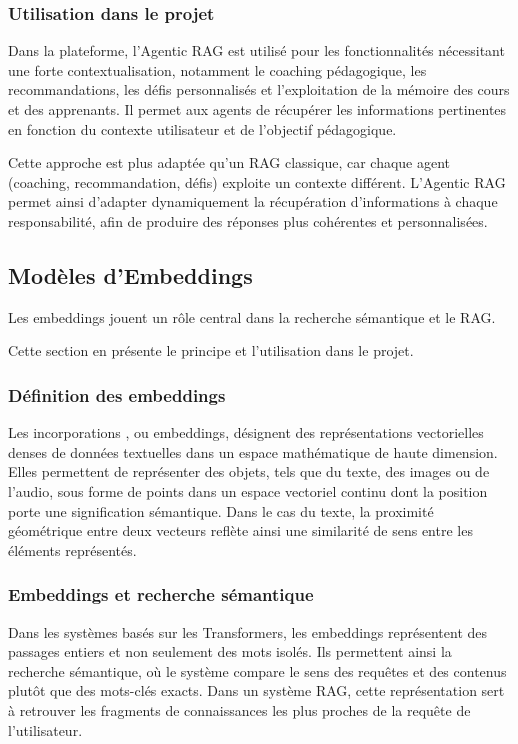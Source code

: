 \subsubsection{Utilisation dans le projet}

Dans la plateforme, l'Agentic RAG est utilisé pour les fonctionnalités nécessitant une forte contextualisation, notamment le coaching pédagogique, les recommandations, les défis personnalisés et l'exploitation de la mémoire des cours et des apprenants. Il permet aux agents de récupérer les informations pertinentes en fonction du contexte utilisateur et de l'objectif pédagogique.

Cette approche est plus adaptée qu'un RAG classique, car chaque agent (coaching, recommandation, défis) exploite un contexte différent. L'Agentic RAG permet ainsi d'adapter dynamiquement la récupération d'informations à chaque responsabilité, afin de produire des réponses plus cohérentes et personnalisées.

\subsection{Modèles d’Embeddings}

Les embeddings jouent un rôle central dans la recherche sémantique et le RAG.

Cette section en présente le principe et l’utilisation dans le projet.

\subsubsection{Définition des embeddings}

Les incorporations \cite{ibm_embedding}, ou embeddings, désignent des représentations vectorielles denses de données textuelles dans un espace mathématique de haute dimension. Elles permettent de représenter des objets, tels que du texte, des images ou de l'audio, sous forme de points dans un espace vectoriel continu dont la position porte une signification sémantique. Dans le cas du texte, la proximité géométrique entre deux vecteurs reflète ainsi une similarité de sens entre les éléments représentés.

\subsubsection{Embeddings et recherche sémantique}

Dans les systèmes basés sur les Transformers, les embeddings représentent des passages entiers et non seulement des mots isolés. Ils permettent ainsi la recherche sémantique, où le système compare le sens des requêtes et des contenus plutôt que des mots-clés exacts. Dans un système RAG, cette représentation sert à retrouver les fragments de connaissances les plus proches de la requête de l'utilisateur.

